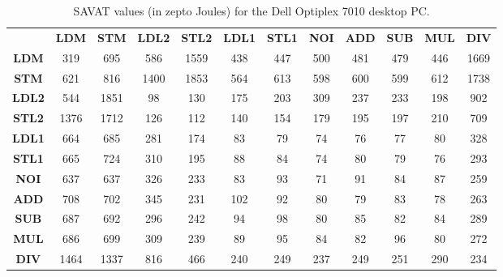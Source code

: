 \begin{table}[htb]
\scriptsize
\setlength{\tabcolsep}{2.3pt}
\setlength\extrarowheight{1pt}
\caption{SAVAT values (in zepto Joules) for the Dell Optiplex 7010 desktop PC.}
\begin{tabular}{|c||c|c|c|c|c|c|c|c|c|c|c|} \hline
& \textbf{LDM} & \textbf{STM} & \textbf{LDL2} & \textbf{STL2} & \textbf{LDL1} & \textbf{STL1} & \textbf{NOI} & \textbf{ADD} & \textbf{SUB} & \textbf{MUL} & \textbf{DIV}
\\ \hhline{|=||=|=|=|=|=|=|=|=|=|=|=|}
\textbf{LDM} &  {319} &  {695} &  {586} &  {1559} &  {438} &  {447} &  {500} &  {481} &  {479} &  {446} &  {1669} \\ \hline
\textbf{STM} &  {621} &  {816} &  {1400} &  {1853} &  {564} &  {613} &  {598} &  {600} &  {599} &  {612} &  {1738} \\ \hline
\textbf{LDL2} &  {544} &  {1851} &  {98} &  {130} &  {175} &  {203} &  {309} &  {237} &  {233} &  {198} &  {902} \\ \hline
\textbf{STL2} &  {1376} &  {1712} &  {126} &  {112} &  {140} &  {154} &  {179} &  {195} &  {197} &  {210} &  {709} \\ \hline
\textbf{LDL1} &  {664} &  {685} &  {281} &  {174} &  {83} &  {79} &  {74} &  {76} &  {77} &  {80} &  {328} \\ \hline
\textbf{STL1} &  {665} &  {724} &  {310} &  {195} &  {88} &  {84} &  {74} &  {80} &  {79} &  {76} &  {293} \\ \hline
\textbf{NOI} &  {637} &  {637} &  {326} &  {233} &  {83} &  {93} &  {71} &  {91} &  {84} &  {87} &  {259} \\ \hline
\textbf{ADD} &  {708} &  {702} &  {345} &  {231} &  {102} &  {92} &  {80} &  {79} &  {83} &  {78} &  {263} \\ \hline
\textbf{SUB} &  {687} &  {692} &  {296} &  {242} &  {94} &  {98} &  {80} &  {85} &  {82} &  {84} &  {289} \\ \hline
\textbf{MUL} &  {686} &  {699} &  {309} &  {239} &  {89} &  {95} &  {84} &  {82} &  {96} &  {80} &  {272} \\ \hline
\textbf{DIV} &  {1464} &  {1337} &  {816} &  {466} &  {240} &  {249} &  {237} &  {249} &  {251} &  {290} &  {234} \\ \hline

\end{tabular}
\label{fig:savat-20cm-d7010}
\end{table}

